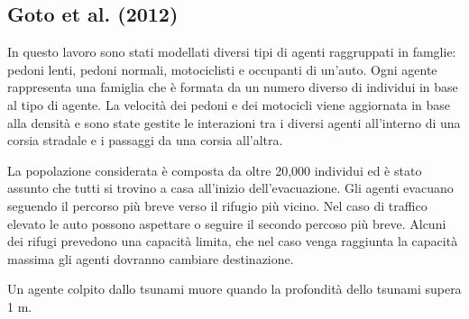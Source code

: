 \subsection{Goto et al. (2012)}
In questo lavoro sono stati modellati diversi tipi di agenti raggruppati in famglie: pedoni lenti, pedoni normali, motociclisti e occupanti di un'auto.
Ogni agente rappresenta una famiglia che è formata da un numero diverso di individui in base al tipo di agente.
%
La velocità dei pedoni e dei motocicli viene aggiornata in base alla densità
e sono state gestite le interazioni tra i diversi agenti all'interno di una corsia stradale e i passaggi da una corsia all'altra.

La popolazione considerata è composta da oltre 20,000 individui ed è stato assunto che tutti si trovino a casa all'inizio dell'evacuazione.
%
Gli agenti evacuano seguendo il percorso più breve verso il rifugio più vicino. Nel caso di traffico elevato le auto possono aspettare o seguire il secondo percoso più breve.
Alcuni dei rifugi prevedono una capacità limita, che nel caso venga raggiunta la capacità massima gli agenti dovranno cambiare destinazione.

Un agente colpito dallo tsunami muore quando la profondità dello tsunami supera 1 m.

